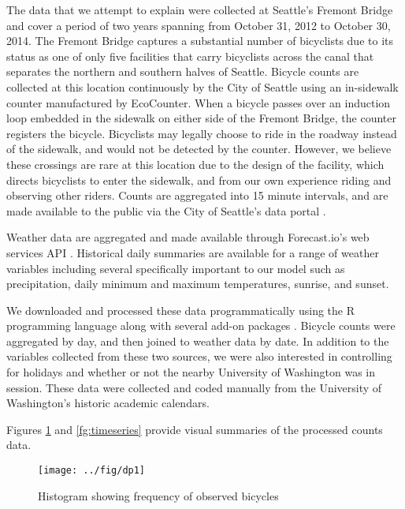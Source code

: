 \documentclass[12pt,letterpaper,article]{memoir} %
\begin{document}
The data that we attempt to explain were collected at Seattle's
Fremont Bridge and cover a period of two years spanning from October
31, 2012 to October 30, 2014. The Fremont Bridge captures a
substantial number of bicyclists due to its status as one of only five
facilities that carry bicyclists across the canal that separates the
northern and southern halves of Seattle. Bicycle counts are collected
at this location continuously by the City of Seattle using an
in-sidewalk counter manufactured by EcoCounter. When a bicycle passes
over an induction loop embedded in the sidewalk on either side of the
Fremont Bridge, the counter registers the bicycle. Bicyclists may
legally choose to ride in the roadway instead of the sidewalk, and
would not be detected by the counter. However, we believe these
crossings are rare at this location due to the design of the facility,
which directs bicyclists to enter the sidewalk, and from our own
experience riding and observing other riders. Counts are aggregated
into 15 minute intervals, and are made available to the public via the
City of Seattle's data
portal \parencite{City-of-Seattle:aa,City-of-Seattle:ab}.

Weather data are aggregated and made available through Forecast.io's
web services API \parencite{The-Dark-Sky-Company:aa}. Historical daily
summaries are available for a range of weather variables including
several specifically important to our model such as precipitation,
daily minimum and maximum temperatures, sunrise, and sunset.

We downloaded and processed these data programmatically using the R
programming language along with several add-on
packages \parencite{Grolemund:2011aa,Wickham:2011aa,Couture-Beil:2014aa,Lang:2014aa,R-Core-Team:2014aa}.
Bicycle counts were aggregated by day, and then joined to weather data
by date. In addition to the variables collected from these two
sources, we were also interested in controlling for holidays and
whether or not the nearby University of Washington was in session.
These data were collected and coded manually from the University of
Washington's historic academic calendars.

Figures \ref{fg:hist} and \ref{fg:timeseries} provide visual summaries
of the processed counts data.

\begin{figure}[h!]
  \centering
  \texttt{[image: ../fig/dp1]}
  \caption{Histogram showing frequency of observed bicycles}
  \label{fg:hist}
\end{figure}
\end{document}
